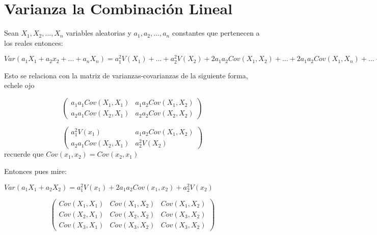 \documentclass{book}
\begin{document}
\section{Varianza  la Combinación Lineal}
Sean $X_1, X_2, ..., X_n $ variables aleatorias y $a_1,a_2,..., a_n$ constantes que pertenecen a los reales entonces:

$Var(a_1X_1+a_2x_2+...+a_nX_n) = a_1^2 V(X_1) + ... + a_2^2 V(X_2) + 2a_1a_2 Cov(X_1,X_2) + ... +  2a_1a_2 Cov(X_1,X_n)+...+ 2a_n a_{n-1} Cov(X_n,X_{n-1})$

Esto se relaciona con la matriz de varianzas-covarianzas de la siguiente forma, echele ojo

$$
\begin{pmatrix}
a_1 a_1 Cov(X_1, X_1) &  a_1 a_2 Cov(X_1,X_2)   \\
a_2 a_1 Cov(X_2, X_1) & a_2 a_2 Cov(X_2,X_2)  
\end{pmatrix}
$$

$$
\begin{pmatrix}
a_1^2 V(x_1) &  a_1 a_2 Cov(X_1,X_2)   \\
a_2 a_1 Cov(X_2, X_1) & a_2^2 V(X_2)  
\end{pmatrix}
$$
recuerde que $Cov(x_1,x_2) = Cov(x_2,x_1) $

Entonces pues mire: 

$Var(a_1X_1+a_2X_2)= a_1^2V(x_1) + 2a_1a_2 Cov(x_1,x_2) + a_2^2V(x_2)$

$$
\begin{pmatrix}
Cov(X_1, X_1) & Cov(X_1,X_2) & Cov(X_1,X_2)  \\
Cov(X_2, X_1) & Cov(X_2,X_2) & Cov(X_3,X_2)  \\
Cov(X_3, X_1) & Cov(X_3,X_2) & Cov(X_3,X_2)   
\end{pmatrix}
$$







\end{document}
